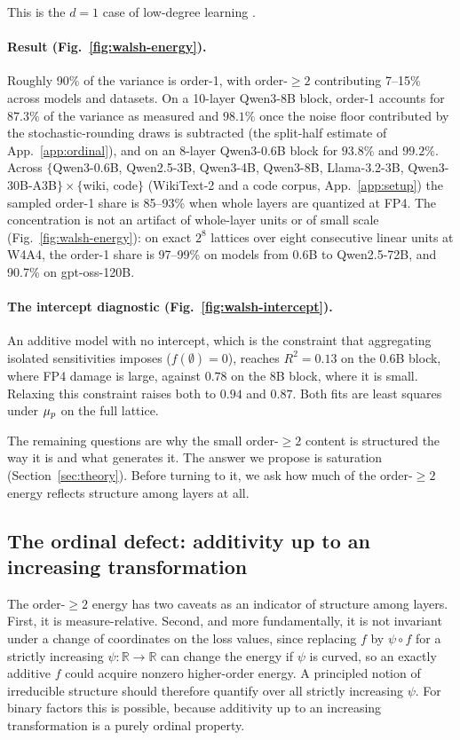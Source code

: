 This is the $d=1$ case of low-degree learning \citep{odonnell2014boolean,lmn1993,sobol2001}.

\paragraph{Result (Fig.~\ref{fig:walsh-energy}).} Roughly 90\% of the variance is order-1, with
order-$\ge 2$ contributing 7--15\% across models and datasets. On a 10-layer Qwen3-8B block,
order-1 accounts for $87.3\%$ of the variance as measured and $98.1\%$ once the noise floor
contributed by the stochastic-rounding draws is subtracted (the split-half estimate of
App.~\ref{app:ordinal}), and on an 8-layer Qwen3-0.6B block for
$93.8\%$ and $99.2\%$. Across $\{$Qwen3-0.6B, Qwen2.5-3B, Qwen3-4B, Qwen3-8B, Llama-3.2-3B,
Qwen3-30B-A3B$\}\times\{$wiki, code$\}$ (WikiText-2 and a code corpus, App.~\ref{app:setup}) the
sampled order-1 share is 85--93\% when whole layers are quantized at FP4. The concentration is not an
artifact of whole-layer units or of small scale (Fig.~\ref{fig:walsh-energy}): on exact $2^8$ lattices
over eight consecutive linear units at W4A4, the order-1 share is 97--99\% on models from 0.6B to
Qwen2.5-72B, and 90.7\% on gpt-oss-120B.

\paragraph{The intercept diagnostic (Fig.~\ref{fig:walsh-intercept}).} An additive model with no
intercept, which is the constraint that aggregating isolated sensitivities imposes ($f(\emptyset)=0$),
reaches $R^2=0.13$ on the 0.6B block, where FP4 damage is large, against $0.78$ on the 8B block, where it
is small. Relaxing this constraint raises both to $0.94$ and $0.87$. Both fits are least squares under
$\mu_p$ on the full lattice.

The remaining questions are why the small order-$\ge 2$ content is structured the way it is and what
generates it. The answer we propose is saturation (Section~\ref{sec:theory}). Before turning to it, we ask how much of the
order-$\ge 2$ energy reflects structure among layers at all.

\subsection{The ordinal defect: additivity up to an increasing transformation}\label{sec:ordinal}

The order-$\ge 2$ energy has two caveats as an indicator of structure among layers. First, it is
measure-relative. 
Second, and more fundamentally, it is not
invariant under a change of coordinates on the loss values, since replacing $f$ by $\psi \circ f$ for a
strictly increasing $\psi:\mathbb{R}\to\mathbb{R}$ can change the energy if $\psi$ is curved, 
so an exactly additive $f$ could acquire nonzero higher-order energy. A principled
notion of irreducible structure should therefore quantify over all strictly increasing $\psi$. For
binary factors this is possible, because additivity up to an increasing transformation is a purely ordinal
property.

